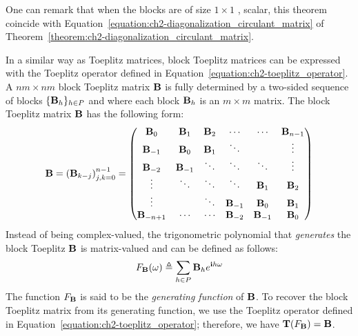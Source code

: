 \noindent
One can remark that when the blocks are of size $1\times1$ \ie, scalar, this theorem coincide with Equation~\ref{equation:ch2-diagonalization_circulant_matrix} of Theorem~\ref{theorem:ch2-diagonalization_circulant_matrix}.


In a similar way as Toeplitz matrices, block Toeplitz matrices can be expressed with the Toeplitz operator defined in Equation~\ref{equation:ch2-toeplitz_operator}.
A $nm\times nm$ block Toeplitz matrix $\mathbf{B}$ is fully determined by a two-sided sequence of blocks $\{\mathbf{B}_h\}_{h \in P}$ and where each block $\mathbf{B}_h$ is an $m \times m$ matrix.  
The block Toeplitz matrix $\mathbf{B}$ has the following form:
\begin{equation}
  \Bmat = \leftmat \Bmat_{k-j} \rightmat_{j,k = 0}^{n-1} = 
  \leftmatrix
    \Bmat_{0}    & \Bmat_{1}  & \Bmat_{2} & \cdots     & \cdots     & \Bmat_{n-1} \\
    \Bmat_{-1}   & \Bmat_{0}  & \Bmat_{1} & \ddots     &            & \vdots      \\
    \Bmat_{-2}   & \Bmat_{-1} & \ddots    & \ddots     & \ddots     & \vdots      \\ 
    \vdots       & \ddots     & \ddots    & \ddots     & \Bmat_{1}  & \Bmat_{2}   \\
    \vdots       &            & \ddots    & \Bmat_{-1} & \Bmat_{0}  & \Bmat_{1}   \\
    \Bmat_{-n+1} & \cdots     & \cdots    & \Bmat_{-2} & \Bmat_{-1} & \Bmat_0
  \rightmatrix
\end{equation}
\noindent
Instead of being complex-valued, the trigonometric polynomial that \emph{generates} the block Toeplitz $\mathbf{B}$ is matrix-valued and can be defined as follows:
\begin{equation}
  F_{\mathbf{B}}(\omega) \triangleq \sum_{h \in P} \mathbf{B}_h e^{\mathbf{i} h \omega}
\end{equation}
The function $F_{\mathbf{B}}$ is said to be the \emph{generating function} of $\mathbf{B}$.
To recover the block Toeplitz matrix from its generating function, we use the Toeplitz operator defined in Equation~\ref{equation:ch2-toeplitz_operator}; therefore, we have $\mathbf{T}(F_\mathbf{B}) = \mathbf{B}$.




















